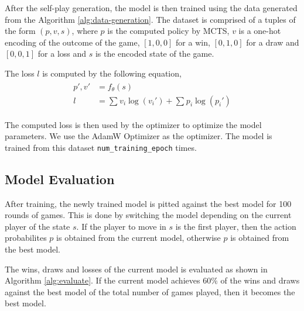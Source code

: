 After the self-play generation, the model is then trained using the data generated from the Algorithm \ref{alg:data-generation}. The dataset is comprised of a tuples of the form $(p, v, s)$, where $p$ is the computed policy by MCTS, $v$ is a one-hot encoding of the outcome of the game, $[1, 0, 0]$ for a win, $[0, 1, 0]$ for a draw and $[0, 0, 1]$ for a loss and $s$ is the encoded state of the game.

The loss $l$ is computed by the following equation,
\begin{align}
  \begin{split}
      p', v' &= f_{\theta}(s) \\ l &= \sum_{}^{} v_{i}\log(v_{i}') + \sum_{}^{}p_{i}\log(p_{i}')
  \end{split}
  \label{eq:loss}
\end{align}

The computed loss is then used by the optimizer to optimize the model parameters. We use the AdamW Optimizer as the optimizer. The model is trained from this dataset \verb|num_training_epoch| times.

\subsection{Model Evaluation}

After training, the newly trained model is pitted against the best model for 100 rounds of games. This is done by switching the model depending on the current player of the state $s$. If the player to move in $s$ is the first player, then the action probabilites $p$ is obtained from the current model, otherwise $p$ is obtained from the best model.

The wins, draws and losses of the current model is evaluated as shown in Algorithm \ref{alg:evaluate}. If the current model achieves $60\%$ of the wins and draws against the best model of the total number of games played, then it becomes the best model. 

